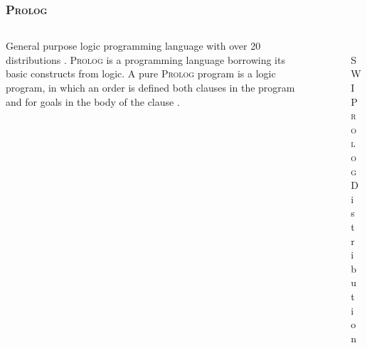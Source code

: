 \documentclass[aspectratio=1610]{beamer}
\begin{document}
\begin{frame}
\frametitle{\textsc{Prolog}}
  \begin{columns}[T]
    \begin{column}{.6\textwidth}
     \begin{block}{}
General purpose logic programming language with over 20 distributions \cite{prologwiki}. \textsc{Prolog} is a programming language borrowing its basic constructs from logic. A pure \textsc{Prolog} program is a logic program, in which an order is defined both clauses in the program and for goals in the body of the clause \cite{sterling1994art}.
    \end{block}
    \end{column}
    \begin{column}{.4\textwidth}
    \begin{block}{}
\begin{figure}
    \includegraphics[width=\textwidth]{swipl.png} 
    \caption{\textsc{SWI Prolog} Distribution \cite{swipl}}
 \end{figure}   
    \end{block}
    \end{column}
  \end{columns}
\end{frame}

\end{document}
